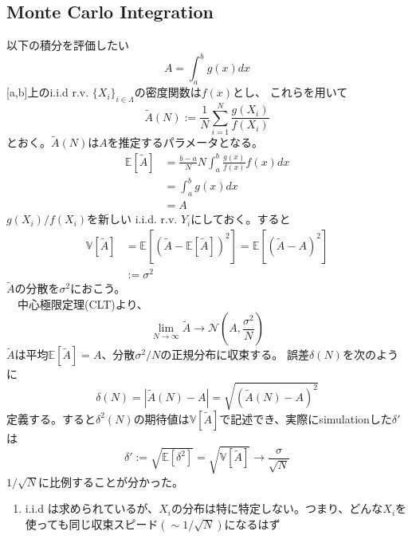 \documentclass[10pt]{article}
\begin{document}
\subsection{Monte Carlo Integration}
以下の積分を評価したい
\begin{equation}
    A = \int_{a}^{b}g(x)dx
\end{equation}
[a,b]上のi.i.d r.v. $\{X_i\}_{i\in\Lambda}$の密度関数は$f(x)$とし、
これらを用いて
\begin{equation}
    \tilde{A}(N):=\frac{1}{N}\sum_{i=1}^{N}\frac{g(X_i)}{f(X_i)}
\end{equation}
とおく。$\tilde{A}(N)$は$A$を推定するパラメータとなる。
\begin{equation}
    \begin{split}
        \mathbb{E}[\tilde{A}]   &=\frac{b-a}{N}N\int_{a}^{b}\frac{g(x)}{f(x)}f(x)dx\\
        &=\int_{a}^{b}g(x)dx\\
        &=A
    \end{split}
\end{equation}
$g(X_i)/f(X_i)$を新しい i.i.d. r.v. $Y_i$にしておく。すると
\begin{equation}
    \begin{split}
        \mathbb{V}[\tilde{A}]&=\mathbb{E}[(\tilde{A}-\mathbb{E}[\tilde{A}])^2]=\mathbb{E}[(\tilde{A}-A)^2]\\
        &:=\sigma^2
    \end{split}
\end{equation}
$\tilde{A}$の分散を$\sigma^2$におこう。\\
　中心極限定理(CLT)より、
\begin{equation}
    \lim_{N\rightarrow\infty}\tilde{A}\rightarrow \mathcal{N}(A,\frac{\sigma^2}{N})
\end{equation}
$\tilde{A}$は平均$\mathbb{E}[\tilde{A}]=A$、分散$\sigma^2/N$の正規分布に収束する。
誤差$\delta(N)$を次のように
\begin{equation}
    \delta(N)=|\tilde{A}(N)-A|=\sqrt{(\tilde{A}(N)-A)^2}
\end{equation}
定義する。すると$\delta^2(N)$の期待値は$\mathbb{V}[\tilde{A}]$で記述でき、実際にsimulationした$\delta'$は
\begin{equation}
    \delta':=\sqrt{\mathbb{E}[\delta^2]}=\sqrt{\mathbb{V}[\tilde{A}]}\rightarrow\frac{\sigma}{\sqrt{N}}
\end{equation}
$1/\sqrt{N}$に比例することが分かった。
\begin{enumerate}
    \item i.i.d は求められているが、$X_i$の分布は特に特定しない。つまり、どんな$X_i$を使っても同じ収束スピード$(\sim1/\sqrt{N})$になるはず
\end{enumerate}
\end{document}
